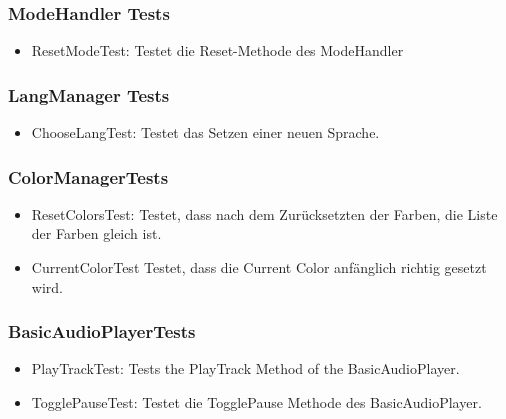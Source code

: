 \documentclass[../validierung.tex]{subfiles}
\begin{document}
	\subsubsection{ModeHandler Tests}
		\begin{itemize}
			\item ResetModeTest: Testet die Reset-Methode des ModeHandler
		\end{itemize}
	\subsubsection{LangManager Tests}
		\begin{itemize}
			\item ChooseLangTest: Testet das Setzen einer neuen Sprache.
		\end{itemize}
	\subsubsection{ColorManagerTests}
		\begin{itemize}
			\item ResetColorsTest: Testet, dass nach dem Zurücksetzten der Farben, die Liste der Farben gleich ist.
			\item CurrentColorTest Testet, dass die Current Color anfänglich richtig gesetzt wird.
		\end{itemize}
	\subsubsection{BasicAudioPlayerTests}
		\begin{itemize}
			\item PlayTrackTest: Tests the PlayTrack Method of the BasicAudioPlayer.
			\item TogglePauseTest: Testet die TogglePause Methode des BasicAudioPlayer.
		\end{itemize}
\end{document}
